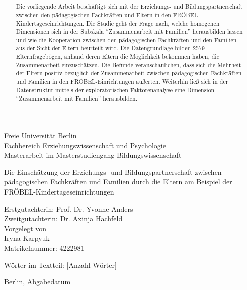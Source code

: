 \documentclass[12pt,a4paper]{article}
\author{}
\title{  }
\begin{document}
\begin{titlepage}

\normalsize

\begin{center}
Freie Universität Berlin \\
Fachbereich Erziehungswissenschaft und Psychologie\\
Masterarbeit im Masterstudiengang Bildungswissenschaft
\end{center}

\vspace{30pt}

\begin{center}
\huge
Die Einschätzung der Erziehungs- und Bildungspartnerschaft zwischen pädagogischen Fachkräften und Familien durch die Eltern am Beispiel der FRÖBEL-Kindertageseinrichtungen\\  
\vspace{50pt}
 \end{center}
                         
\normalsize  
\begin{center}
Erstgutachterin:  Prof. Dr. Yvonne Anders\\
Zweitgutachterin:  Dr. Axinja Hachfeld                             \\
Vorgelegt von\\ 
Iryna Karpyuk \\
Matrikelnummer: 4222981\\
\end{center}                  
Wörter im Textteil: [Anzahl Wörter]\\     

\begin{center}
\normalsize
\vspace{150pt}

Berlin, Abgabedatum
\end{center}
\end{titlepage}
\normalsize                                              
\pagebreak

\begin{abstract}
Die vorliegende Arbeit beschäftigt sich mit der Erziehungs- und Bildungspartnerschaft zwischen den pädagogischen Fachkräften und Eltern in den FRÖBEL-Kindertageseinrichtungen. Die Studie geht der Frage nach, welche homogenen Dimensionen sich in der Subskala "`Zusammenarbeit mit Familien"' herausbilden lassen und wie die Kooperation zwischen den pädagogischen Fachkräften und den Familien aus der Sicht der Eltern beurteilt wird.
Die Datengrundlage bilden 2579 Elternfragebögen, anhand deren Eltern die Möglichkeit bekommen haben, die Zusammenarbeit einzuschätzen.
Die Befunde veranschaulichen, dass sich die Mehrheit der Eltern positiv bezüglich der Zusammenarbeit zwischen pädagogischen Fachkräften und Familien in den FRÖBEL-Einrichtungen äußerten. Weiterhin ließ sich in der Datenstruktur mittels der exploratorischen Faktorenanalyse eine Dimension "`Zusammenarbeit mit Familien"' herausbilden. 

\end{abstract}
\end{document}
